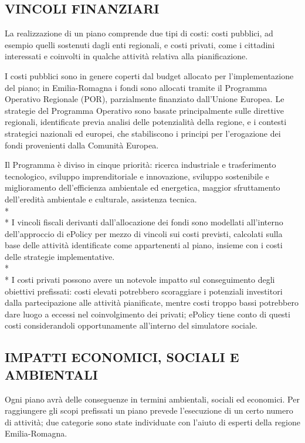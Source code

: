 \documentclass[12pt,a4paper,openright,twoside]{report}
\begin{document}
\subsection[VINCOLI FINANZIARI]{\nohyphens{VINCOLI FINANZIARI}}
La realizzazione di un piano comprende due tipi di costi: costi pubblici, ad esempio quelli sostenuti dagli enti regionali, e costi privati, come i cittadini interessati e coinvolti in qualche attività relativa alla pianificazione.

I costi pubblici sono in genere coperti dal budget allocato per l'implementazione del piano;  in Emilia-Romagna i fondi sono allocati tramite il Programma Operativo Regionale \cite{POR} (POR), parzialmente finanziato dall'Unione Europea. Le strategie del Programma Operativo sono basate principalmente sulle direttive regionali, identificate previa analisi delle potenzialità della regione, e i contesti strategici nazionali ed europei, che stabiliscono i principi per l'erogazione dei fondi provenienti dalla Comunità Europea.

Il Programma è diviso in cinque priorità: ricerca industriale e trasferimento tecnologico, sviluppo imprenditoriale e innovazione, sviluppo sostenibile e miglioramento dell'efficienza ambientale ed energetica, maggior sfruttamento dell'eredità ambientale e culturale, assistenza tecnica.\\*\\*
I vincoli fiscali derivanti dall'allocazione dei fondi sono modellati all'interno dell'approccio di ePolicy per mezzo di vincoli sui costi previsti, calcolati sulla base delle attività identificate come appartenenti al piano, insieme con i costi delle strategie implementative. \\*\\*
I costi privati possono avere un notevole impatto sul conseguimento degli obiettivi prefissati: costi elevati potrebbero scoraggiare i potenziali investitori dalla partecipazione alle attività pianificate, mentre costi troppo bassi potrebbero dare luogo a eccessi nel coinvolgimento dei privati; ePolicy tiene conto di questi costi considerandoli opportunamente all'interno del simulatore sociale.
 
\subsection[IMPATTI]{\nohyphens{IMPATTI ECONOMICI, SOCIALI E AMBIENTALI}}
Ogni piano avrà delle conseguenze in termini ambientali, sociali ed economici. Per raggiungere gli scopi prefissati un piano prevede l'esecuzione di un certo numero di attività; due categorie sono state individuate con l'aiuto di esperti della regione Emilia-Romagna.
\end{document}
